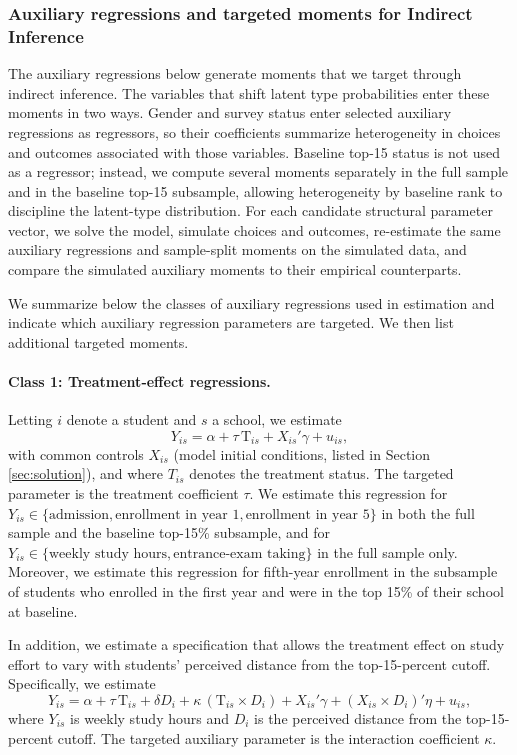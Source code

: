 \subsubsection{Auxiliary regressions and targeted moments for Indirect Inference }\label{sec:moments}

The auxiliary regressions below generate moments that we target through indirect inference. The variables that shift latent type probabilities enter these moments in two ways. Gender and survey status enter selected auxiliary regressions as regressors, so their coefficients summarize heterogeneity in choices and outcomes associated with those variables. Baseline top-15 status is not used as a regressor; instead, we compute several moments separately in the full sample and in the baseline top-15 subsample, allowing heterogeneity by baseline rank to discipline the latent-type distribution. For each candidate structural parameter vector, we solve the model, simulate choices and outcomes, re-estimate the same auxiliary regressions and sample-split moments on the simulated data, and compare the simulated auxiliary moments to their empirical counterparts.\par
We summarize below the classes of auxiliary regressions used in estimation and indicate which auxiliary regression parameters are targeted. We then list additional targeted moments. 

\paragraph{Class 1: Treatment-effect regressions.}
Letting $i$ denote a student and $s$ a school, we estimate 
\begin{equation}
Y_{is} = \alpha + \tau \,\text{T}_{is} + X_{is}'\gamma + u_{is},
\end{equation}
with common controls $X_{is}$ (model initial conditions, listed in Section \ref{sec:solution}), and where $T_{is}$ denotes the treatment status. The targeted parameter is the treatment coefficient $\tau$. We estimate this regression for $Y_{is} \in \{\text{admission}, \text{enrollment in year 1}, \text{enrollment in year 5}\}$ in both the full sample and the baseline top-15\% subsample, and for $Y_{is} \in \{\text{weekly study hours}, \text{entrance-exam taking}\}$ in the full sample only. Moreover, we estimate this regression for fifth-year enrollment in the subsample of students who enrolled in the first year and were in the top 15\% of their school at baseline.\par 
In addition, we estimate a specification that allows the treatment effect on study effort to vary with students’ perceived distance from the top-15-percent cutoff. Specifically, we estimate
\begin{equation}
Y_{is} = \alpha + \tau \,\text{T}_{is} + \delta D_i + \kappa \,(\text{T}_{is} \times D_i)
      + X_{is}'\gamma + (X_{is} \times D_i)'\eta + u_{is},
\end{equation}
where $Y_{is}$ is weekly study hours and $D_i$ is the perceived distance from the top-15-percent cutoff. The targeted auxiliary parameter is the interaction coefficient $\kappa$.





